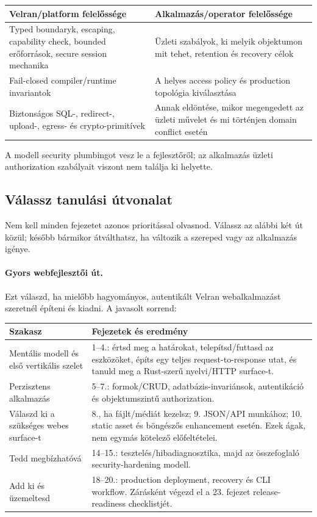 \begin{center}
\begin{tabularx}{\textwidth}{@{}Y Y@{}}
\toprule
\textbf{Velran/platform felelőssége} & \textbf{Alkalmazás/operator felelőssége} \\
\midrule
Typed boundaryk, escaping, capability check, bounded erőforrások, secure session mechanika & Üzleti szabályok, ki melyik objektumon mit tehet, retention és recovery célok \\
Fail-closed compiler/runtime invariantok & A helyes access policy és production topológia kiválasztása \\
Biztonságos SQL-, redirect-, upload-, egress- és crypto-primitívek & Annak eldöntése, mikor megengedett az üzleti művelet és mi történjen domain conflict esetén \\
\bottomrule
\end{tabularx}
\end{center}

A modell security plumbingot vesz le a fejlesztőről; az alkalmazás üzleti authorization szabályait viszont nem találja ki helyette.

\subsection*{Válassz tanulási útvonalat}

Nem kell minden fejezetet azonos prioritással olvasnod. Válassz az alábbi két út közül; később bármikor átválthatsz, ha változik a szereped vagy az alkalmazás igénye.

\paragraph{Gyors webfejlesztői út.}
Ezt válaszd, ha mielőbb hagyományos, autentikált Velran webalkalmazást szeretnél építeni és kiadni. A javasolt sorrend:

\begin{center}
\begin{tabularx}{\textwidth}{@{}L{0.23\textwidth} Y@{}}
\toprule
\textbf{Szakasz} & \textbf{Fejezetek és eredmény} \\
\midrule
Mentális modell és első vertikális szelet & 1--4.: értsd meg a határokat, telepítsd/futtasd az eszközöket, építs egy teljes request-to-response utat, és tanuld meg a Rust-szerű nyelvi/HTTP surface-t. \\
Perzisztens alkalmazás & 5--7.: formok/CRUD, adatbázis-invariánsok, autentikáció és objektumszintű authorization. \\
Válaszd ki a szükséges webes surface-t & 8., ha fájlt/médiát kezelsz; 9. JSON/API munkához; 10. static asset és böngészős enhancement esetén. Ezek ágak, nem egymás kötelező előfeltételei. \\
Tedd megbízhatóvá & 14--15.: tesztelés/hibadiagnosztika, majd az összefoglaló security-hardening modell. \\
Add ki és üzemeltesd & 18--20.: production deployment, recovery és CLI workflow. Zárásként végezd el a 23. fejezet release-readiness checklistjét. \\
\bottomrule
\end{tabularx}
\end{center}

